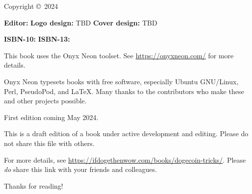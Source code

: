 \thispagestyle{empty}

\huge{\booktitle}
\newline
\large{\booksubtitle}
\newline
\newline
\normalsize

Copyright \copyright~2024 \bookauthor

\vfill
\textbf{Editor:} \bookauthor\newline
\textbf{Logo design:} TBD\newline
\textbf{Cover design:} TBD

\textbf{ISBN-10:} \bookisbnten\newline
\textbf{ISBN-13:} \bookisbnthirteen

This book uses the Onyx Neon toolset. See \url{https://onyxneon.com/} for more
details.

Onyx Neon typesets books with free software, especially Ubuntu GNU/Linux, Perl,
PseudoPod, and \LaTeX. Many thanks to the contributors who make these and other
projects possible.

First edition coming May 2024.

This is a draft edition of a book under active development and editing. Please do not share this file with others.

For more details, see \url{https://ifdogethenwow.com/books/dogecoin-tricks/}.
Please \emph{do} share this link with your friends and colleagues.

Thanks for reading!
